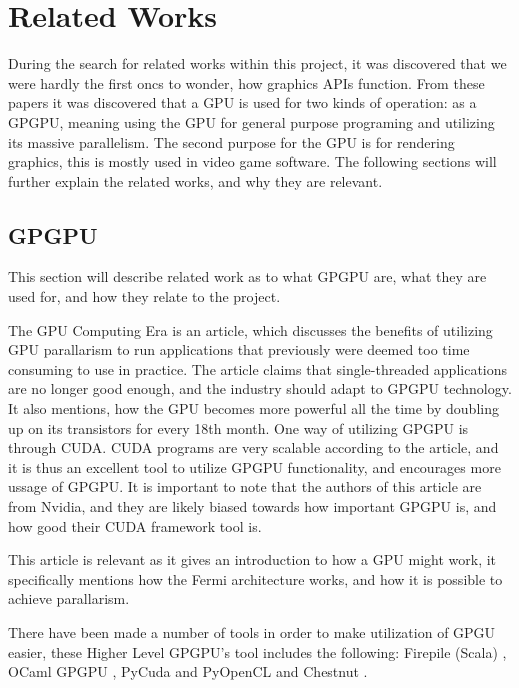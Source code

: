\section{Related Works}\label{sec:related_works}
During the search for related works within this project, it was discovered that we were hardly the first oncs to wonder, how graphics \glspl{API} function. From these papers it was discovered that a \gls{GPU} is used for two kinds of operation: as a GP\gls{GPU}, meaning using the \gls{GPU} for general purpose programing and utilizing its massive parallelism. 
The second purpose for the \gls{GPU} is for rendering graphics, this is mostly used in video game software. The following sections will further explain the related works, and why they are relevant.

\subsection{GP\gls{GPU}}
This section will describe related work as to what GP\gls{GPU} are, what they are used for, and how they relate to the project.

The GPU Computing Era \cite{gpu_computing_era} is an article, which discusses the benefits of utilizing \gls{GPU} parallarism to run applications that previously were deemed too time consuming to use in practice. 
The article claims that single-threaded applications are no longer good enough, and the industry should adapt to GP\gls{GPU} technology. 
It also mentions, how the \gls{GPU} becomes more powerful all the time by doubling up on its transistors for every 18th month. 
One way of utilizing GP\gls{GPU} is through CUDA.
CUDA programs are very scalable according to the article, and it is thus an excellent tool to utilize GP\gls{GPU} functionality, and encourages more ussage of GP\gls{GPU}. It is important to note that the authors of this article are from Nvidia, and they are likely biased towards how important GP\gls{GPU} is, and how good their CUDA framework tool is. 

This article is relevant as it gives an introduction to how a \gls{GPU} might work, it specifically mentions how the Fermi architecture works, and how it is possible to achieve parallarism.

There have been made a number of tools in order to make utilization of GPGU easier, these Higher Level GP\gls{GPU}'s tool includes the following: Firepile (Scala) \cite{2011_firepile}, OCaml GP\gls{GPU} \cite{bourgoin_2017_high}, PyCuda and PyOpenCL \cite{2012_pycuda_pyopencl} and Chestnut \cite{stromme_2012_chestnut}.

